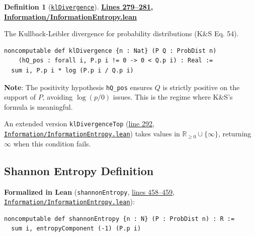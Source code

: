 \documentclass[11pt]{article}
\theoremstyle{definition}
\newtheorem{definition}[theorem]{Definition}
\theoremstyle{remark}
\begin{document}
\begin{definition}[\href{https://github.com/zariuq/ks-foundations-of-inference/blob/main/KnuthSkilling/Information/InformationEntropy.lean\#L279}{\texttt{klDivergence}}]
\textbf{\href{https://github.com/zariuq/ks-foundations-of-inference/blob/main/KnuthSkilling/Information/InformationEntropy.lean\#L279-L281}{Lines 279--281, Information/InformationEntropy.lean}}

The Kullback-Leibler divergence for probability distributions (K\&S Eq. 54).
\end{definition}

\begin{lstlisting}[caption={\texttt{klDivergence} (\href{https://github.com/zariuq/ks-foundations-of-inference/blob/main/KnuthSkilling/Information/InformationEntropy.lean\#L279}{Information/InformationEntropy.lean:279})},numbers=none]
noncomputable def klDivergence {n : Nat} (P Q : ProbDist n)
    (hQ_pos : forall i, P.p i != 0 -> 0 < Q.p i) : Real :=
  sum i, P.p i * log (P.p i / Q.p i)
\end{lstlisting}

\textbf{Note}: The positivity hypothesis \texttt{hQ\_pos} ensures $Q$ is strictly positive on the support of $P$,
avoiding $\log(p/0)$ issues. This is the regime where K\&S's formula is meaningful.

An extended version \texttt{klDivergenceTop} (\href{https://github.com/zariuq/ks-foundations-of-inference/blob/main/KnuthSkilling/Information/InformationEntropy.lean\#L292}{line 292}, \href{https://github.com/zariuq/ks-foundations-of-inference/blob/main/KnuthSkilling/Information/InformationEntropy.lean}{\texttt{Information/InformationEntropy.lean}}) takes values in
$\mathbb{R}_{\geq 0} \cup \{\infty\}$, returning $\infty$ when this condition fails.

\subsection{Shannon Entropy Definition}

\textbf{Formalized in Lean} (\texttt{shannonEntropy}, \href{https://github.com/zariuq/ks-foundations-of-inference/blob/main/KnuthSkilling/Information/InformationEntropy.lean\#L458-L459}{lines 458--459}, \href{https://github.com/zariuq/ks-foundations-of-inference/blob/main/KnuthSkilling/Information/InformationEntropy.lean}{\texttt{Information/InformationEntropy.lean}}):
\begin{lstlisting}[caption={Shannon entropy from the variational framework},numbers=none]
noncomputable def shannonEntropy {n : N} (P : ProbDist n) : R :=
  sum i, entropyComponent (-1) (P.p i)
\end{lstlisting}
\end{document}
